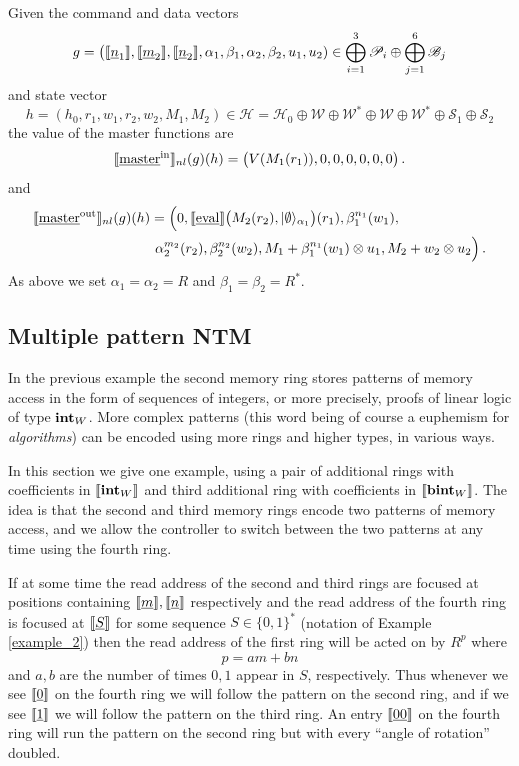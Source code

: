 \documentclass[english,letter paper,12pt,leqno]{article}
\theoremstyle{example}
\numberwithin{equation}{section}
\begin{document}
Given the command and data vectors
\[
g = \big( \llbracket \underline{n}_1 \rrbracket, \llbracket \underline{m}_2 \rrbracket, \llbracket \underline{n}_2 \rrbracket, \alpha_1, \beta_1, \alpha_2, \beta_2, u_1, u_2 ) \in \bigoplus_{i=1}^3 \mathscr{P}_i \oplus \bigoplus_{j=1}^6 \mathscr{B}_j
\]
and state vector
\[
h = (h_0, r_1, w_1, r_2, w_2, M_1, M_2) \in \mathscr{H} = \mathscr{H}_0 \oplus \mathscr{W} \oplus \mathscr{W}^* \oplus \mathscr{W} \oplus \mathscr{W}^* \oplus \mathscr{S}_1 \oplus \mathscr{S}_2
\]
the value of the master functions are
\[
\llbracket \underline{\textup{master}}^{\mathrm{in}} \rrbracket_{nl}(g)(h)
= \big(V(M_1(r_1)), 0, 0, 0, 0, 0, 0 \big)\,.
\]
and
\begin{align*}
\llbracket \underline{\textup{master}}^{\mathrm{out}} \rrbracket_{nl}&(g)(h) = \Big( 0, \llbracket \underline{\mathrm{eval}} \rrbracket\big( M_2(r_2), \lvert\emptyset\rangle_{\alpha_1} \big)(r_1), \beta_1^{n_1}(w_1),\\
&\qquad \quad \alpha_2^{m_2}(r_2), \beta_2^{n_2}(w_2), M_1 + \beta_1^{n_1}(w_1) \otimes u_1, M_2 + w_2 \otimes u_2 \Big)\,.
\end{align*}
As above we set $\alpha_1 = \alpha_2 = R$ and $\beta_1 = \beta_2 = R^*$. 

\subsection{Multiple pattern NTM}\label{example:ntm_super}

In the previous example the second memory ring stores patterns of memory access in the form of sequences of integers, or more precisely, proofs of linear logic of type $\textbf{int}_W$. More complex patterns (this word being of course a euphemism for \emph{algorithms}) can be encoded using more rings and higher types, in various ways.

In this section we give one example, using a pair of additional rings with coefficients in $\llbracket \textbf{int}_W \rrbracket$ and third additional ring with coefficients in $\llbracket \textbf{bint}_W \rrbracket$. The idea is that the second and third memory rings encode two patterns of memory access, and we allow the controller to switch between the two patterns at any time using the fourth ring. 

If at some time the read address of the second and third rings are focused at positions containing $\llbracket \underline{m} \rrbracket, \llbracket \underline{n} \rrbracket$ respectively and the read address of the fourth ring is focused at $\llbracket \underline{S} \rrbracket$ for some sequence $S \in \{0,1\}^*$ (notation of Example \ref{example_2}) then the read address of the first ring will be acted on by $R^p$ where
\[
p = am + bn
\]
and $a, b$ are the number of times $0,1$ appear in $S$, respectively. Thus whenever we see $\llbracket \underline{0} \rrbracket$ on the fourth ring we will follow the pattern on the second ring, and if we see $\llbracket \underline{1} \rrbracket$ we will follow the pattern on the third ring. An entry $\llbracket \underline{00} \rrbracket$ on the fourth ring will run the pattern on the second ring but with every ``angle of rotation'' doubled. 
\end{document}
